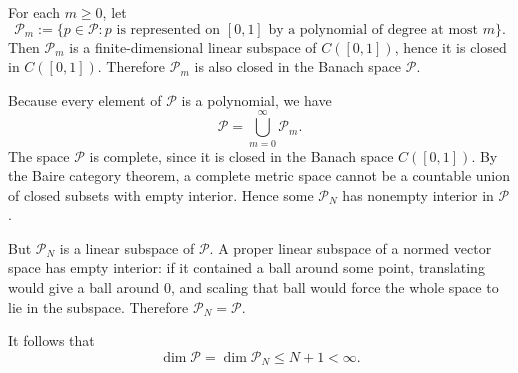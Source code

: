 \begin{solution}
For each $m\geq 0$, let
\[
\mathcal{P}_m:=\{p\in\mathcal{P}: p \text{ is represented on } [0,1]
\text{ by a polynomial of degree at most } m\}.
\]
Then $\mathcal{P}_m$ is a finite-dimensional linear subspace of $C([0,1])$, hence it is closed in $C([0,1])$.  Therefore $\mathcal{P}_m$ is also closed in the Banach space $\mathcal{P}$.

Because every element of $\mathcal{P}$ is a polynomial, we have
\[
\mathcal{P}=\bigcup_{m=0}^{\infty}\mathcal{P}_m.
\]
The space $\mathcal{P}$ is complete, since it is closed in the Banach space $C([0,1])$.  By the Baire category theorem, a complete metric space cannot be a countable union of closed subsets with empty interior.  Hence some $\mathcal{P}_N$ has nonempty interior in $\mathcal{P}$.

But $\mathcal{P}_N$ is a linear subspace of $\mathcal{P}$.  A proper linear subspace of a normed vector space has empty interior: if it contained a ball around some point, translating would give a ball around $0$, and scaling that ball would force the whole space to lie in the subspace.  Therefore $\mathcal{P}_N=\mathcal{P}$.

It follows that
\[
\dim\mathcal{P}=\dim\mathcal{P}_N\leq N+1<\infty.
\]
\end{solution}

